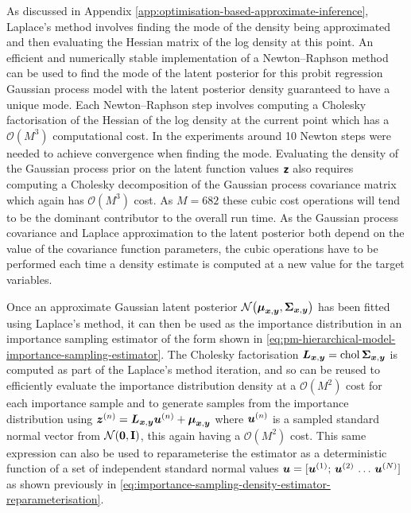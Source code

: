 As discussed in Appendix \ref{app:optimisation-based-approximate-inference}, Laplace's method involves finding the mode of the density being approximated and then evaluating the Hessian matrix of the log density at this point. An efficient and numerically stable implementation of a Newton--Raphson method can be used to find the mode of the latent posterior for this probit regression Gaussian process model \citep[\S 3.4]{rasmussen2006gaussian} with the latent posterior density guaranteed to have a unique mode. Each Newton--Raphson step involves computing a Cholesky factorisation of the Hessian of the log density at the current point which has a $\mathcal{O}(M^3)$ computational cost. In the experiments around 10 Newton steps were needed to achieve convergence when finding the mode. Evaluating the density of the Gaussian process prior on the latent function values $\boldsymbol{\mathsf{z}}$ also requires computing a Cholesky decomposition of the Gaussian process covariance matrix which again has $\mathcal{O}(M^3)$ cost. As $M=682$ these cubic cost operations will tend to be the dominant contributor to the overall run time. As the Gaussian process covariance and Laplace approximation to the latent posterior both depend on the value of the covariance function parameters, the cubic operations have to be performed each time a density estimate is computed at a new value for the target variables.

Once an approximate Gaussian latent posterior $\nrm{\vct{\mu}_{\vct{x},\vct{y}},\mtx{\Sigma}_{\vct{x},\vct{y}}}$ has been fitted using Laplace's method, it can then be used as the importance distribution in an importance sampling estimator of the form shown in \eqref{eq:pm-hierarchical-model-importance-sampling-estimator}. The Cholesky factorisation $\boldsymbol{L}_{\boldsymbol{x},\boldsymbol{y}}= \operatorname{chol}\boldsymbol{\Sigma}_{\boldsymbol{x},\boldsymbol{y}}$ is computed as part of the Laplace's method iteration, and so can be reused to efficiently evaluate the importance distribution density at a $\mathcal{O}(M^2)$ cost for each importance sample and to generate samples from the importance distribution using $\boldsymbol{z}^{(n)} = \boldsymbol{L}_{\boldsymbol{x},\boldsymbol{y}}\boldsymbol{u}^{(n)} + \boldsymbol{\mu}_{\boldsymbol{x},\boldsymbol{y}}$ where $\boldsymbol{u}^{(n)}$ is a sampled standard normal vector from $\nrm{\vct{0},\mathbf{I}}$, this again having a $\mathcal{O}(M^2)$ cost. This same expression can also be used to reparameterise the estimator as a deterministic function of a set of independent standard normal values $\boldsymbol{u} = [\boldsymbol{u}^{(1)};\,\boldsymbol{u}^{(2)}\,\dots\,\boldsymbol{u}^{(N)}]$ as shown previously in \eqref{eq:importance-sampling-density-estimator-reparameterisation}.

